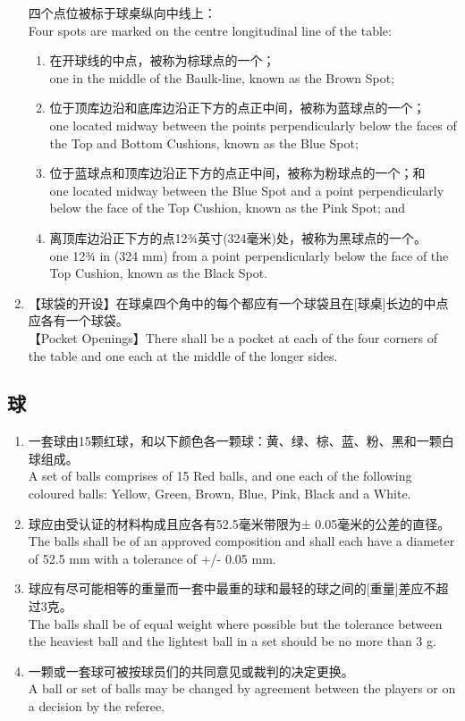 \begin{enumerate}[label=(\alph*)]
    四个点位被标于球桌纵向中线上：\\
    Four spots are marked on the centre longitudinal line of the table:
    \begin{enumerate}[label=(\roman*)]
        \item 在开球线的中点，被称为棕球点的一个；\\
        one in the middle of the Baulk-line, known as the Brown Spot;
        \item 位于顶库边沿和底库边沿正下方的点正中间，被称为蓝球点的一个；\\
        one located midway between the points perpendicularly below the faces of the Top and Bottom Cushions, known as the Blue Spot;
        \item 位于蓝球点和顶库边沿正下方的点正中间，被称为粉球点的一个；和\\
        one located midway between the Blue Spot and a point perpendicularly below the face of the Top Cushion, known as the Pink Spot; and
        \item 离顶库边沿正下方的点12¾英寸(324毫米)处，被称为黑球点的一个。\\
        one 12¾ in (324 mm) from a point perpendicularly below the face of the Top Cushion, known as the Black Spot.
    \end{enumerate}
    \item【球袋的开设】在球桌四个角中的每个都应有一个球袋且在[球桌]长边的中点应各有一个球袋。\\
    【Pocket Openings】There shall be a pocket at each of the four corners of the table and one each at the middle of the longer sides.
\end{enumerate}

\subsection{球}

\begin{enumerate}
    \item 一套球由15颗红球，和以下颜色各一颗球：黄、绿、棕、蓝、粉、黑和一颗白球组成。\\
    A set of balls comprises of 15 Red balls, and one each of the following coloured balls: Yellow, Green, Brown, Blue, Pink, Black and a White. 
    \item 球应由受认证的材料构成且应各有52.5毫米带限为± 0.05毫米的公差的直径。\\
    The balls shall be of an approved composition and shall each have a diameter of 52.5 mm with a tolerance of +/- 0.05 mm.
    \item 球应有尽可能相等的重量而一套中最重的球和最轻的球之间的[重量]差应不超
    过3克。\\
    The balls shall be of equal weight where possible but the tolerance between the heaviest ball and the lightest ball in a set should be no more than 3 g.
    \item 一颗或一套球可被按球员们的共同意见或裁判的决定更换。\\
    A ball or set of balls may be changed by agreement between the players or on a decision by the referee.
\end{enumerate}

